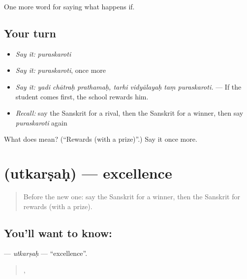 \begin{grammarlens}[title={What you've built}]
One more word for saying what happens if.
\end{grammarlens}

\subsection*{Your turn}
\begin{itemize}
\raggedright
  \item \emph{Say it:} \emph{puraskaroti}
  \item \emph{Say it:} \emph{puraskaroti}, once more
  \item \emph{Say it:} \emph{yadi chātraḥ prathamaḥ, tarhi vidyālayaḥ taṃ puraskaroti.} — If the student comes first, the school rewards him.
  \item \emph{Recall:} say the Sanskrit for a rival, then the Sanskrit for a winner, then say \emph{puraskaroti} again
\end{itemize}

\begin{tcolorbox}[breakable,colback=teal!4,colframe=teal!35!black,title={Before you move on}]
What does  mean? (\textquotedblleft{}Rewards (with a prize)\textquotedblright{}.) Say it once more.
\end{tcolorbox}
\section[\texorpdfstring{\sk{उत्कर्षः} (utkarṣaḥ)}{उत्कर्षः (utkarṣaḥ)}]{ (utkarṣaḥ) — excellence}

\label{lesson:SA-C385-utkarsah}



\begin{quote}
Before the new one: say the Sanskrit for a winner, then the Sanskrit for rewards (with a prize).
\end{quote}

\subsection*{You'll want to know: }
\textbf{} — \emph{utkarṣaḥ} — \textquotedblleft{}excellence\textquotedblright{}.

\begin{quote}
   ,   
\end{quote}

